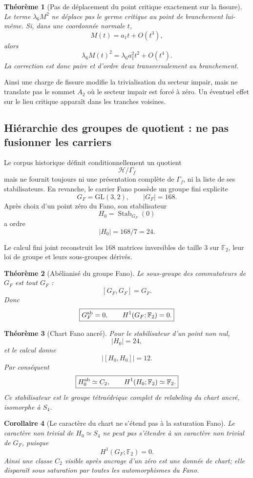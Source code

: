 \documentclass[11pt,a4paper]{article}
\newtheorem{theorem}{Théorème}[section]
\newtheorem{corollary}[theorem]{Corollaire}
\begin{document}
\begin{theorem}[Pas de déplacement du point critique exactement sur la fissure]\label{thm:v21-no-shift-at-branch}
Le terme $\lambda_6M^2$ ne déplace pas le germe critique au point de branchement lui-même. Si, dans une coordonnée normale $t$,
\[
 M(t)=a_1t+O(t^3),
\]
alors
\[
 \lambda_6M(t)^2
 =
 \lambda_6a_1^2t^2+O(t^4).
\]
La correction est donc paire et d'ordre deux transversalement au branchement.
\end{theorem}

Ainsi une charge de fissure modifie la trivialisation du secteur impair, mais ne translate pas le sommet $A_2$ où le secteur impair est forcé à zéro. Un éventuel effet sur le lieu critique apparaît dans les tranches voisines.

\subsection{Hiérarchie des groupes de quotient : ne pas fusionner les carriers}

Le corpus historique définit conditionnellement un quotient
\[
 \mathcal H/\Gamma_f
\]
mais ne fournit toujours ni une présentation complète de $\Gamma_f$, ni la liste de ses stabilisateurs. En revanche, le carrier Fano possède un groupe fini explicite
\[
 G_F=\mathrm{GL}(3,2),
 \qquad
 |G_F|=168.
\]
Après choix d'un point zéro du Fano, son stabilisateur
\[
 H_0=\operatorname{Stab}_{G_F}(0)
\]
a ordre
\[
 |H_0|=168/7=24.
\]

Le calcul fini joint reconstruit les $168$ matrices inversibles de taille $3$ sur $\mathbb F_2$, leur loi de groupe et leurs sous-groupes dérivés.

\begin{theorem}[Abélianisé du groupe Fano]\label{thm:v21-fano-H1}
Le sous-groupe des commutateurs de $G_F$ est tout $G_F$ :
\[
 [G_F,G_F]=G_F.
\]
Donc
\[
 \boxed{
 G_F^{\rm ab}=0,
 \qquad
 H^1(G_F;\mathbb F_2)=0.}
\]
\end{theorem}

\begin{theorem}[Chart Fano ancré]\label{thm:v21-anchored-H1}
Pour le stabilisateur d'un point non nul,
\[
 |H_0|=24,
\]
et le calcul donne
\[
 |[H_0,H_0]|=12.
\]
Par conséquent
\[
 \boxed{
 H_0^{\rm ab}\simeq C_2,
 \qquad
 H^1(H_0;\mathbb F_2)\simeq\mathbb F_2.}
\]
Ce stabilisateur est le groupe tétraédrique complet de relabeling du chart ancré, isomorphe à $S_4$.
\end{theorem}

\begin{corollary}[Le caractère du chart ne s'étend pas à la saturation Fano]\label{cor:v21-character-noextend}
Le caractère non trivial de $H_0\simeq S_4$ ne peut pas s'étendre à un caractère non trivial de $G_F$, puisque
\[
 H^1(G_F;\mathbb F_2)=0.
\]
Ainsi une classe $C_2$ visible après ancrage d'un zéro est une donnée de chart; elle disparaît sous saturation par toutes les automorphismes du Fano.
\end{corollary}
\end{document}

